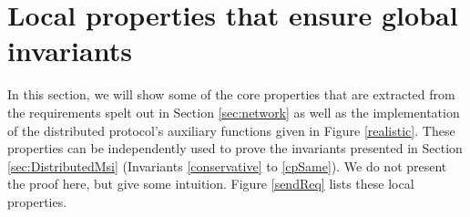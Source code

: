 \section{Local properties that ensure global invariants}
\label{sec:properties}

In this section, we will show some of the core properties that are extracted
from the requirements spelt out in Section \ref{sec:network} as well as the
implementation of the distributed protocol's auxiliary functions given in Figure
\ref{realistic}. These properties can be independently used to prove the
invariants presented in Section \ref{sec:DistributedMsi} (Invariants
\ref{conservative} to \ref{cpSame}). We do not present the proof here, but give
some intuition. Figure \ref{sendReq} lists these local properties.


